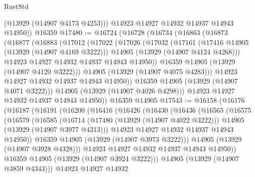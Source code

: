 \begin{lexlean}{RustStd}
\begin{coremodule}
          (@13929 (@14907 @4173 @4253)))
        @14923
        @14927
        @14932
        @14937
        @14943
        @14950))
    @16359
@17480 := @16724
    (@16728
      (@16734
        (@16863
          (@16873
            (@16877
              (@16883
                (@17012
                  (@17022
                    (@17026
                      (@17032
                        (@17161
                          (@17416 @14905 (@13929 (@14907 @4169 @3222)))
                          @14905
                          (@13929 (@14907 @4124 @4268)))
                        @14923
                        @14927
                        @14932
                        @14937
                        @14943
                        @14950))
                    @16359
                    @14905
                    (@13929 (@14907 @4120 @3222)))
                  @14905
                  (@13929 (@14907 @4075 @4283)))
                @14923
                @14927
                @14932
                @14937
                @14943
                @14950))
            @16359
            @14905
            (@13929 (@14907 @4071 @3222)))
          @14905
          (@13929 (@14907 @4026 @4298)))
        @14923
        @14927
        @14932
        @14937
        @14943
        @14950))
    @16359
    @14905
@17543 := @16158
    (@16176
      (@16187
        (@16191
          (@16200
            (@16416
              (@16426
                (@16430
                  (@16436
                    (@16565
                      (@16575
                        (@16579
                          (@16585
                            (@16714
                              (@17480 (@13929 (@14907 @4022 @3222)))
                              @14905
                              (@13929 (@14907 @3977 @4313)))
                            @14923
                            @14927
                            @14932
                            @14937
                            @14943
                            @14950))
                        @16359
                        @14905
                        (@13929 (@14907 @3973 @3222)))
                      @14905
                      (@13929 (@14907 @3928 @4328)))
                    @14923
                    @14927
                    @14932
                    @14937
                    @14943
                    @14950))
                @16359
                @14905
                (@13929 (@14907 @3924 @3222)))
              @14905
              (@13929 (@14907 @3859 @4343)))
            @14923
            @14927
            @14932

\end{coremodule}
\end{lexlean}
